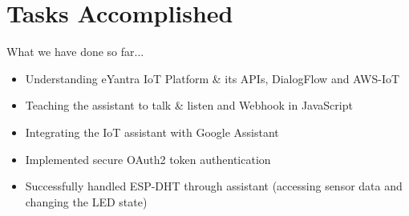 \documentclass[10pt, a4paper]{beamer}
\begin{document}
\section{Tasks Accomplished}
\begin{frame}{What we have done so far...}
	\begin{itemize}
		\item Understanding eYantra IoT Platform \& its APIs, DialogFlow and AWS-IoT
		\newline
		\item Teaching the assistant to talk \& listen and Webhook in JavaScript
		\newline
		\item Integrating the IoT assistant with Google Assistant
		\newline
		\item Implemented secure OAuth2 token authentication
		\newline
		\item Successfully handled ESP-DHT through assistant (accessing sensor data and changing the LED state)
	\end{itemize}
\end{frame}
\end{document}
